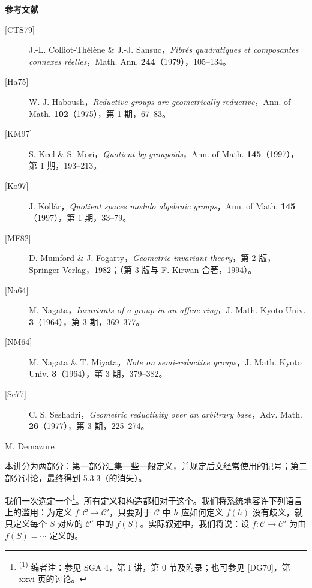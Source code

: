 \textbf{参考文献}
\begin{description}
\item[{[CTS79]}] J.-L. Colliot-Thélène \& J.-J. Sansuc，\emph{Fibrés quadratiques et composantes connexes réelles}，Math. Ann. \textbf{244}（1979），105--134。
\item[{[Ha75]}] W. J. Haboush，\emph{Reductive groups are geometrically reductive}，Ann. of Math. \textbf{102}（1975），第 1 期，67--83。
\item[{[KM97]}] S. Keel \& S. Mori，\emph{Quotient by groupoids}，Ann. of Math. \textbf{145}（1997），第 1 期，193--213。
\item[{[Ko97]}] J. Kollár，\emph{Quotient spaces modulo algebraic groups}，Ann. of Math. \textbf{145}（1997），第 1 期，33--79。
\item[{[MF82]}] D. Mumford \& J. Fogarty，\emph{Geometric invariant theory}，第 2 版，Springer-Verlag，1982；（第 3 版与 F. Kirwan 合著，1994）。
\item[{[Na64]}] M. Nagata，\emph{Invariants of a group in an affine ring}，J. Math. Kyoto Univ. \textbf{3}（1964），第 3 期，369--377。
\item[{[NM64]}] M. Nagata \& T. Miyata，\emph{Note on semi-reductive groups}，J. Math. Kyoto Univ. \textbf{3}（1964），第 3 期，379--382。
\item[{[Se77]}] C. S. Seshadri，\emph{Geometric reductivity over an arbitrary base}，Adv. Math. \textbf{26}（1977），第 3 期，225--274。
\end{description}

\begin{center}M. Demazure\end{center}
本讲分为两部分：第一部分汇集一些一般定义，并规定后文经常使用的记号；第二部分讨论，最终得到 5.3.3（的消失）。

我们一次选定一个\footnote{\textsuperscript{(1)} 编者注：参见 SGA 4，第 I 讲，第 0 节及附录；也可参见 [DG70]，第 xxvi 页的讨论。}。所有定义和构造都相对于这个。我们将系统地容许下列语言上的滥用：为定义 $f:\mathcal C\to\mathcal C'$，只要对于 $\mathcal C$ 中 $h$ 应如何定义 $f(h)$ 没有歧义，就只定义每个 $S$ 对应的 $\mathcal C'$ 中的 $f(S)$。实际叙述中，我们将说：设 $f:\mathcal C\to\mathcal C'$ 为由 $f(S)=\cdots$ 定义的。

